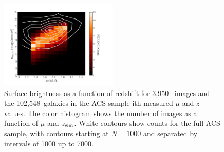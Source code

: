 \documentclass[twocolumn]{aastex6}
\begin{document}
\begin{figure}
\begin{center}
\includegraphics[width=0.5\textwidth]{figures/eye_of_sauron.pdf}
\caption{Surface brightness as a function of redshift for 3,950~\ferengi{} images and the 102,548~galaxies in the ACS sample ith measured $\mu$ and $z$ values. The color histogram shows the number of \ferengi{} images as a function of $\mu$ and $z_{\rm sim}$. White contours show counts for the full ACS sample, with contours starting at $N=1000$ and separated by intervals of 1000 up to 7000.} 
\label{fig:sb_redshift}
\end{center}
\end{figure}
\end{document}
